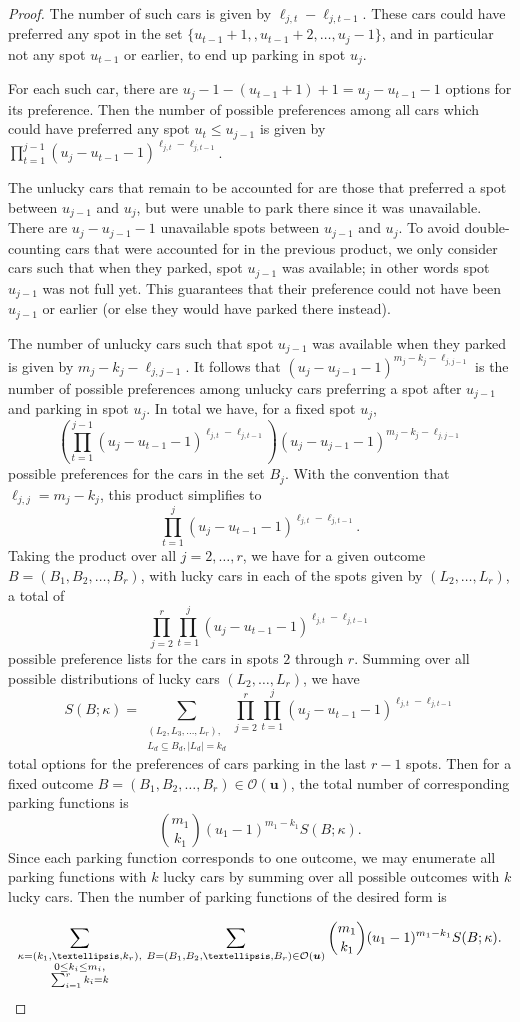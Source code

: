 \documentclass[10pt,a4paper]{amsart}
\newcommand{\bsy}{\boldsymbol}
\newcommand{\out}{\mathcal{O}}
\begin{document}
\begin{proof}
The number of such cars is given by $\ell_{j,t}-\ell_{j,t-1}$. These cars could have preferred any spot in the set $\{u_{t-1}+1, ,u_{t-1}+2,\ldots, u_{j}-1\}$, and in particular not any spot $u_{t-1}$ or earlier, to end up parking in spot $u_j$.

For each such car, there are {$u_{j}-1 - (u_{t-1} +1 ) +1 = u_{j} - u_{t-1} -1 $} options for its preference. 
Then the number of possible preferences among all cars which could have preferred any spot $u_t \leq u_{j-1}$ is given by $\prod_{t=1}^{j-1} (u_{j}-u_{t-1}-1)^{\ell_{j,t}-\ell_{j,{t-1}}}$.

The unlucky cars that remain to be accounted for are those that preferred a spot between $u_{j-1}$ and $u_j$, but were unable to park there since it was unavailable.
There are {$u_j-u_{j-1}-1$} unavailable spots between $u_{j-1}$ and $u_j$. To avoid double-counting cars that were accounted for in the previous product, we only consider cars such that when they parked, spot $u_{j-1}$ was available; in other words spot $u_{j-1}$ was not full yet. This guarantees that their preference could not have been $u_{j-1}$ or earlier (or else they would have parked there instead).


The number of unlucky cars such that spot {$u_{j-1}$} was {available} when they parked is given by $m_j-k_j-\ell_{j,j-1}$. 
It follows that $(u_j-u_{j-1}-1)^{m_j-k_j-\ell_{j,j-1}}$ is the number of possible preferences among unlucky cars preferring a spot after $u_{j-1}$ and parking in spot $u_j$.
In total we have, for a fixed spot $u_j$, $$ \left(\prod_{t=1}^{j-1} (u_{j}-u_{t-1}-1)^{\ell_{j,t}-\ell_{j,t-1}}\right)\left(u_j-u_{j-1}-1\right)^{m_j-k_j-\ell_{j,j-1}}$$ possible preferences for the cars in the set $B_j$.
With the convention that $\ell_{j,j} = m_j - k_j$, this product simplifies to
\[ \prod_{t=1}^{j} (u_{j}-u_{t-1}-1)^{\ell_{j,t}-\ell_{j,t-1}}.\] 
Taking the product over all $j=2,\ldots, r$, we have for
a given outcome $B = (B_1,B_2,\ldots, B_r)$,  with lucky cars in each of the spots given by $(L_2,\ldots, L_r)$, a total of
\[ \prod_{j=2}^r \prod_{t=1}^{j} (u_{j}-u_{t-1}-1)^{\ell_{j,t}-\ell_{j,t-1}}\] possible preference lists for the cars in spots $2$ through $r$.
Summing over all possible distributions of lucky cars $(L_2,\ldots, L_r)$, we have 
\[S(B;\kappa) = \sum_{\substack{(L_2,L_3,\ldots,L_r), \\L_d\subseteq B_d, |L_d|=k_d}}\prod_{j=2}^r \prod_{t=1}^{j} (u_{j}-u_{t-1}-1)^{\ell_{j,t}-\ell_{j,t-1}}\]
total options for the preferences of cars parking in the last $r-1$ spots. Then for a fixed outcome $B = (B_1,B_2,\ldots, B_r) \in \out(\bsy u)$, the total number of corresponding parking functions is
\[
\binom{m_1}{k_1}(u_1-1)^{m_1-k_1} S(B ; \kappa).
\]
Since each parking function corresponds to one outcome, we may enumerate all parking functions with $k$ lucky cars by summing over all possible outcomes with $k$ lucky cars. Then the number of parking functions of the desired form is 

\[
\sum_{\substack{\kappa = (k_1,\ldots, k_r),\\0\leq k_i\leq m_i,\\\sum_{i=1}^{r}k_i=k}}
\,\sum_{{B = (B_1,B_2,\ldots, B_r) \in \out(\bsy u)}}\binom{m_1}{k_1}(u_1-1)^{m_1-k_1} S(B ; \kappa). \qedhere
\]
\end{proof}
\end{document}
